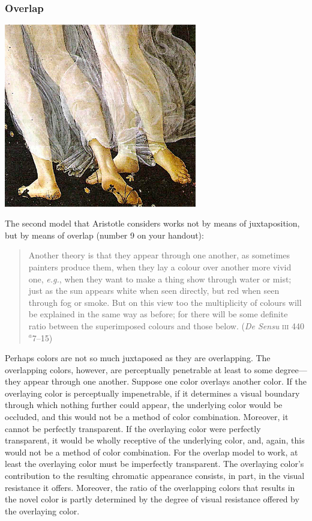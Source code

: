 \begin{frame}[t]\frametitle{Overlap}
	\begin{center}
		\includegraphics[height=8cm]{../../graphics/botticelli1.jpg}
	\end{center}
\end{frame}

The second model that Aristotle considers works not by means of juxtaposition, but by means of overlap (number 9 on your handout):
\begin{quote}
	Another theory is that they appear through one another, as sometimes painters produce them, when they lay a colour over another more vivid one, \emph{e.g.}, when they want to make a thing show through water or mist; just as the sun appears white when seen directly, but red when seen through fog or smoke. But on this view too the multiplicity of colours will be explained in the same way as before; for there will be some definite ratio between the superimposed colours and those below. (\emph{De Sensu} \textsc{iii} 440\( ^{a} \)7--15)
\end{quote}
Perhaps colors are not so much juxtaposed as they are overlapping. The overlapping colors, however, are perceptually penetrable at least to some degree---they appear through one another. Suppose one color overlays another color. If the overlaying color is perceptually impenetrable, if it determines a visual boundary through which nothing further could appear, the underlying color would be occluded, and this would not be a method of color combination. Moreover, it cannot be perfectly transparent. If the overlaying color were perfectly transparent, it would be wholly receptive of the underlying color, and, again, this would not be a method of color combination. For the overlap model to work, at least the overlaying color must be imperfectly transparent. The overlaying color's contribution to the resulting chromatic appearance consists, in part, in the visual resistance it offers. Moreover, the ratio of the overlapping colors that results in the novel color is partly determined by the degree of visual resistance offered by the overlaying color.

